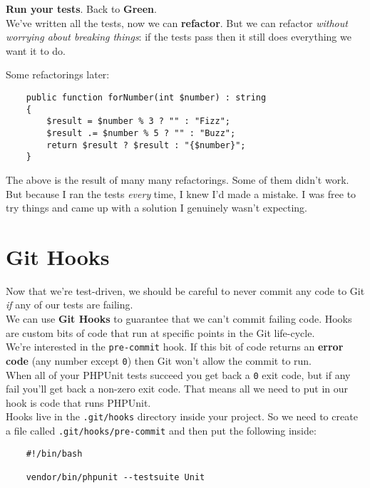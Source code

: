\textbf{Run your tests}. Back to \textbf{Green}.
\\

We've written all the tests, now we can \textbf{refactor}. But we can refactor \textit{without worrying about breaking things}: if the tests pass then it still does everything we want it to do.
\\

\hr

Some refactorings later:

\begin{verbatim}
    public function forNumber(int $number) : string
    {
        $result = $number % 3 ? "" : "Fizz";
        $result .= $number % 5 ? "" : "Buzz";
        return $result ? $result : "{$number}";
    }
\end{verbatim}

The above is the result of many many refactorings. Some of them didn't work. But because I ran the tests \textit{every} time, I knew I'd made a mistake. I was free to try things and came up with a solution I genuinely wasn't expecting.


\section{Git Hooks}

Now that we're test-driven, we should be careful to never commit any code to Git \textit{if} any of our tests are failing.
\\

We can use \textbf{Git Hooks} to guarantee that we can't commit failing code. Hooks are custom bits of code that run at specific points in the Git life-cycle.
\\

We're interested in the \texttt{pre-commit} hook. If this bit of code returns an \textbf{error code} (any number except \texttt{0}) then Git won't allow the commit to run.
\\

When all of your PHPUnit tests succeed you get back a \texttt{0} exit code, but if any fail you'll get back a non-zero exit code. That means all we need to put in our hook is code that runs PHPUnit.
\\

Hooks live in the \texttt{.git/hooks} directory inside your project. So we need to create a file called \texttt{.git/hooks/pre-commit} and then put the following inside:

\begin{verbatim}
    #!/bin/bash

    vendor/bin/phpunit --testsuite Unit
\end{verbatim}


